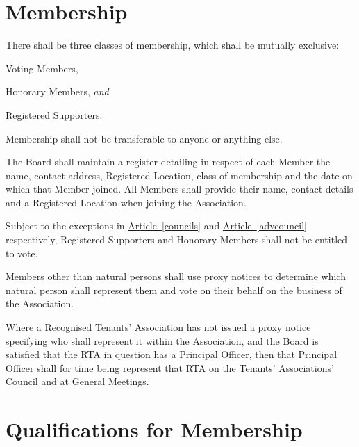 \documentclass[12pt]{article}
\newcommand{\EC}[0]{Board}
\newcommand{\Exec}[0]{\EC{} }
\newcommand{\RTA}[0]{Recognised Tenants' Association}
\newcommand{\ITand}[0]{\textit{and}}
\newcommand{\articleref}[1]{\hyperref[#1]{Article~\ref*{#1}}}
\begin{document}
\section{Membership}
  \begin{constenum}

  \item There shall be three classes of membership, which shall be mutually
    exclusive:
    \begin{constenum}
      \item Voting Members,
      \item Honorary Members, \ITand
      \item Registered Supporters.
    \end{constenum}

  \item Membership shall not be transferable to anyone or anything else.

  \item The \Exec shall maintain a register detailing in respect of
    each Member the name, contact address, Registered Location,
    class of membership and the date on which that Member joined.
    All Members shall provide their name, contact details and a Registered
    Location when joining the Association.

  \item Subject to the exceptions in \articleref{councils} and
    \articleref{advcouncil} respectively, Registered Supporters and
    Honorary Members shall not be entitled to vote.

  \item Members other than natural persons shall use proxy notices to
    determine which natural person shall represent them and vote on
    their behalf on the business of the Association.

  \item Where a \RTA{} has not issued a proxy notice specifying who
    shall represent it within the Association, and the \Exec is
    satisfied that the RTA in question has a Principal Officer, then
    that Principal Officer shall for time being represent that RTA on
    the Tenants' Associations' Council and at General Meetings.

\end{constenum}


\section{Qualifications for Membership}
\end{document}
